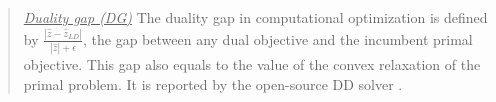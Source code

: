 %

\begin{quote}
\noindent\underline{\textit{Duality gap (DG)}} The duality gap in computational optimization is defined by $\frac{|\hat{z}-\hat{z}_{LD}|}{|\hat{z}|+\epsilon}$, the gap between any dual objective and the incumbent primal objective. This gap also equals to the value of the convex relaxation of the primal problem. It is reported by the open-source DD solver \dsp.
\end{quote}


